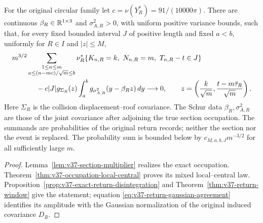 \begin{leadtheorem}
\label{thm:intro-v37-return-window}
For the original circular family let $c=\nu(Y_R^*)=91/(10000\pi)$.
There are continuous $\beta_R\in\mathbb R^{1\times3}$ and
$\sigma_{A,R}^2>0$, with uniform positive variance bounds, such that,
for every fixed bounded interval $J$ of positive length and fixed
$a<b$, uniformly for $R\in I$ and $|z|\le M$,
\begin{align}\label{eq:intro-v37-return-window}
 &m^{3/2}\sum_{\substack{1\le n\le m\\a\le(n-mc)/\sqrt m\le b}}
 \nu_R^*\{K_{n,R}=k,\ N_{n,R}=m,\ T_{n,R}-t\in J\}\notag\\
 &\hspace{12mm}
 -c|J|g_{\Sigma_R}(z)
       \int_a^b g_{\sigma_{A,R}^2}(y-\beta_Rz)\,dy
                           \longrightarrow0,\qquad
 z=\left(\frac{k}{\sqrt m},\frac{t-m\bar\tau_R}{\sqrt m}\right).
\end{align}
Here $\Sigma_R$ is the collision displacement--roof covariance.
The Schur data $\beta_R,\sigma_{A,R}^2$ are those of the joint
covariance after adjoining the true section occupation. The summands
are probabilities of the original return records; neither the section
nor the event is replaced. The probability sum is bounded below by
$c_{M,a,b,J}m^{-3/2}$ for all sufficiently large $m$.
\end{leadtheorem}
\begin{proof}
Lemma~\ref{lem:v37-section-multiplier} realizes the exact occupation.
Theorem~\ref{thm:v37-occupation-local-central} proves its mixed
local--central law. Proposition~\ref{prop:v37-exact-return-disintegration}
and Theorem~\ref{thm:v37-return-window} give the statement; equation
\eqref{eq:v37-return-gaussian-agreement} identifies its amplitude with
the Gaussian normalization of the original induced covariance $D_R$.
\end{proof}


